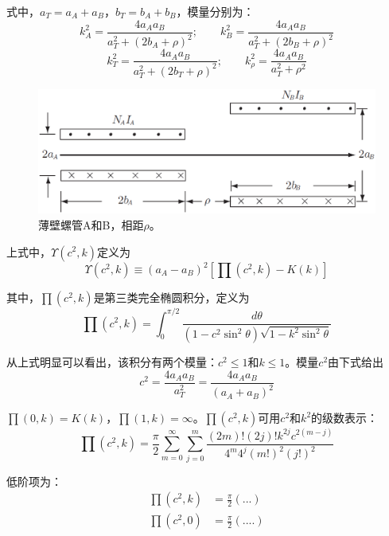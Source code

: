 式中，$a_T=a_A+a_B$，$b_T=b_A+b_B$，模量分别为：
$$k_{A}^2=\frac{4a_A a_B}{a_T^2+(2b_A+\rho)^2} ;\qquad k_{B}^2=\frac{4a_A a_B}{a_T^2+(2b_B+\rho)^2} $$
$$k_{T}^2=\frac{4a_A a_B}{a_T^2+(2b_T+\rho)^2} ;\qquad k_{\rho}^2=\frac{4a_A a_B}{a_T^2+\rho^2} $$

\begin{figure}[htbp]
  \centering
 \includegraphics[scale=0.4]{chpt3/figs/fig3.7.eps}
  \caption{薄壁螺管A和B，相距$\rho$。}
\end{figure}

上式中，$\Upsilon(c^2,k)$定义为
\begin{equation}
  \Upsilon(c^2,k)\equiv(a_A-a_B)^2[\prod(c^2,k)-K(k)]
\end{equation}

其中，$\prod(c^2,k)$是第三类完全椭圆积分，定义为
\begin{equation}
\prod(c^2,k)=\int_{0}^{\pi/2}\frac{d\theta}{(1-c^2\sin^2\theta)\sqrt{1-k^2\sin^2\theta}}
\end{equation}

从上式明显可以看出，该积分有两个模量：$c^2\le 1$和$k\le 1$。模量$c^2$由下式给出
\begin{equation}
c^2=\frac{4a_A a_B}{a_T^2}=\frac{4a_A a_B}{(a_A+a_B)^2}
\end{equation}

$\prod(0,k)=K(k)$，$\prod(1,k)=\infty$。$\prod(c^2,k)$可用$c^2$和$k^2$的级数表示：
\begin{equation}
\prod(c^2,k)=\frac{\pi}{2}\sum_{m=0}^{\infty} \sum_{j=0}^{m} \frac{(2m)!(2j)!k^{2j}c^{2(m-j)}}{4^m 4^j (m!)^2(j!)^2}
\end{equation}

低阶项为：
\begin{subequations}
	\begin{align}
\prod(c^2,k) &= \frac{\pi}{2}(...) \\ 
\prod(c^2,0) &= \frac{\pi}{2}(....)
	\end{align}
\end{subequations}

